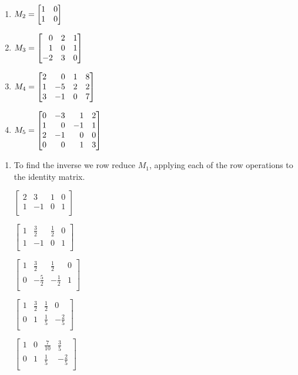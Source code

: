 \begin{exercises}
\begin{problist}
\begin{enumerate}
			\item $M_{2} = \mat{1&0\\1&0}$

			\item $M_{3} = \mat{0&2&1\\1&0&1\\-2&3&0}$

			\item $M_{4} = \mat{2&0&1&8\\1&-5&2&2\\3&-1&0&7}$

			\item $M_{5} = \mat{0&-3&1&2\\1&0&-1&1\\2&-1&0&0\\0&0&1&3}$
		\end{enumerate}

		\begin{solution}
	    \begin{enumerate}
				\item
				To find the inverse we row reduce $M_{1}$, applying each
				of the row operations to the identity matrix.

				$\left[\begin{array}{cc|cc}
							2&3&1&0\\
							1&-1&0&1\\
							\end{array}\right]$

				$\left[\begin{array}{cc|cc}
							1&\frac{3}{2}&\frac{1}{2}&0\\
							1&-1&0&1\\
							\end{array}\right]$

				$\left[\begin{array}{cc|cc}
							1&\frac{3}{2}&\frac{1}{2}&0\\
							0&-\frac{5}{2}&-\frac{1}{2}&1\\
							\end{array}\right]$

				$\left[\begin{array}{cc|cc}
							1&\frac{3}{2}&\frac{1}{2}&0\\
							0&1&\frac{1}{5}&-\frac{2}{5}\\
							\end{array}\right]$

				$\left[\begin{array}{cc|cc}
							1&0&\frac{7}{10}&\frac{3}{5}\\
							0&1&\frac{1}{5}&-\frac{2}{5}\\
							\end{array}\right]$


\end{enumerate}
\end{solution}
\end{problist}
\end{exercises}
